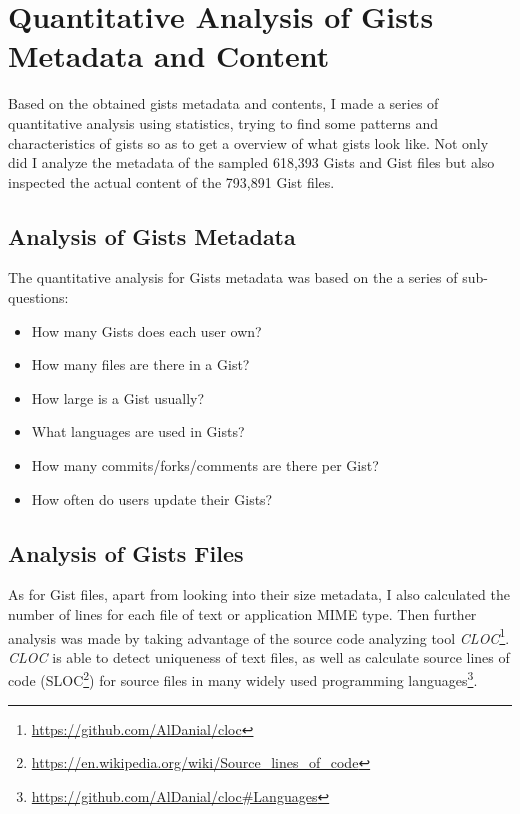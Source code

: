\section{Quantitative Analysis of Gists Metadata and Content}

Based on the obtained gists metadata and contents, I made a series of quantitative analysis using statistics, trying to find some patterns and characteristics of gists so as to get a overview of what gists look like. Not only did I analyze the metadata of the sampled 618,393 Gists and Gist files but also inspected the actual content of the 793,891 Gist files.

\subsection{Analysis of Gists Metadata}

The quantitative analysis for Gists metadata was based on the a series of sub-questions:
\begin{itemize}
	\item How many Gists does each user own?

	\item How many files are there in a Gist?

	\item How large is a Gist usually?

	\item What languages are used in Gists?

	\item How many commits/forks/comments are there per Gist?

	\item How often do users update their Gists?
\end{itemize}

\subsection{Analysis of Gists Files}

As for Gist files, apart from looking into their size metadata, I also calculated the number of lines for each file of text or application MIME type. Then further analysis was made by taking advantage of the source code analyzing tool \textit{CLOC}\footnote{\url{https://github.com/AlDanial/cloc}}. \textit{CLOC} is able to detect uniqueness of text files, as well as calculate source lines of code (SLOC\footnote{\url{https://en.wikipedia.org/wiki/Source_lines_of_code}}) for source files in many widely used programming languages\footnote{\url{https://github.com/AlDanial/cloc\#Languages}}. 